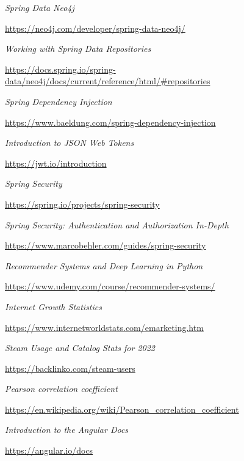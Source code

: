 \documentclass[12pt,a4paper]{report}
\begin{document}
\begin{thebibliography}{9}
  \textit{Spring Data Neo4j}
  
  \url{https://neo4j.com/developer/spring-data-neo4j/}
  
  
  \textit{Working with Spring Data Repositories}
  
  \url{https://docs.spring.io/spring-data/neo4j/docs/current/reference/html/#repositories}
  
  
  \textit{Spring Dependency Injection}
  
  \url{https://www.baeldung.com/spring-dependency-injection}
  
  
  \textit{Introduction to JSON Web Tokens}
  
  \url{https://jwt.io/introduction}
  
  
  \textit{Spring Security}
  
  \url{https://spring.io/projects/spring-security}
  
  
  \textit{Spring Security: Authentication and Authorization In-Depth}
  
  \url{https://www.marcobehler.com/guides/spring-security}
  
  
  \textit{Recommender Systems and Deep Learning in Python}
  
  \url{https://www.udemy.com/course/recommender-systems/}
  
  
  \textit{Internet Growth Statistics}
  
  \url{https://www.internetworldstats.com/emarketing.htm}
  
  
  \textit{Steam Usage and Catalog Stats for 2022}
  
  \url{https://backlinko.com/steam-users}
  
  
  \textit{Pearson correlation coefficient}
  
  \url{https://en.wikipedia.org/wiki/Pearson_correlation_coefficient}
  
  
  \textit{Introduction to the Angular Docs}
  
  \url{https://angular.io/docs}
  

\end{thebibliography}
\end{document}
